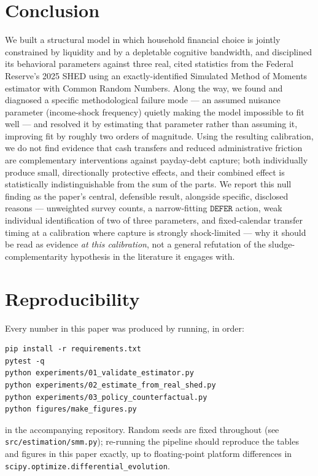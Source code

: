 \documentclass[12pt]{article}
\begin{document}
\section{Conclusion}

We built a structural model in which household financial choice is jointly constrained by liquidity and by a depletable cognitive bandwidth, and disciplined its behavioral parameters against three real, cited statistics from the Federal Reserve's 2025 SHED using an exactly-identified Simulated Method of Moments estimator with Common Random Numbers. Along the way, we found and diagnosed a specific methodological failure mode — an assumed nuisance parameter (income-shock frequency) quietly making the model impossible to fit well — and resolved it by estimating that parameter rather than assuming it, improving fit by roughly two orders of magnitude. Using the resulting calibration, we do not find evidence that cash transfers and reduced administrative friction are complementary interventions against payday-debt capture; both individually produce small, directionally protective effects, and their combined effect is statistically indistinguishable from the sum of the parts. We report this null finding as the paper's central, defensible result, alongside specific, disclosed reasons — unweighted survey counts, a narrow-fitting $\texttt{DEFER}$ action, weak individual identification of two of three parameters, and fixed-calendar transfer timing at a calibration where capture is strongly shock-limited — why it should be read as evidence \emph{at this calibration}, not a general refutation of the sludge-complementarity hypothesis in the literature it engages with.

\newpage
\appendix
\section{Reproducibility}

Every number in this paper was produced by running, in order:
\begin{lstlisting}
pip install -r requirements.txt
pytest -q
python experiments/01_validate_estimator.py
python experiments/02_estimate_from_real_shed.py
python experiments/03_policy_counterfactual.py
python figures/make_figures.py
\end{lstlisting}
in the accompanying repository. Random seeds are fixed throughout (see \texttt{src/estimation/smm.py}); re-running the pipeline should reproduce the tables and figures in this paper exactly, up to floating-point platform differences in \texttt{scipy.optimize.differential\_evolution}.
\end{document}
